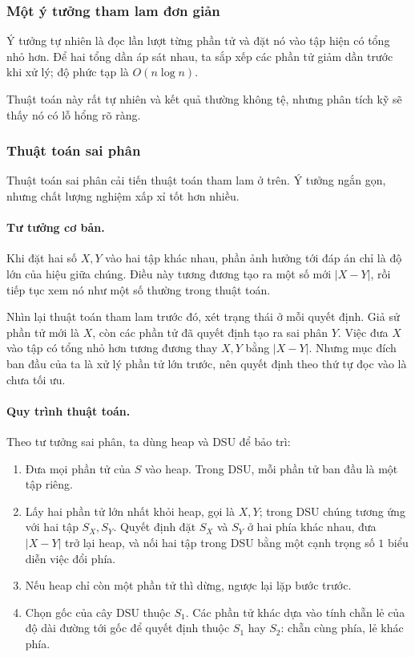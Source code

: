 \documentclass[11pt]{article}
\begin{document}
\subsubsection{Một ý tưởng tham lam đơn giản}

Ý tưởng tự nhiên là đọc lần lượt từng phần tử và đặt nó vào tập hiện có tổng nhỏ
hơn. Để hai tổng dần áp sát nhau, ta sắp xếp các phần tử giảm dần trước khi xử
lý; độ phức tạp là \(O(n\log n)\).

Thuật toán này rất tự nhiên và kết quả thường không tệ, nhưng phân tích kỹ sẽ
thấy nó có lỗ hổng rõ ràng.

\subsubsection{Thuật toán sai phân}

Thuật toán sai phân cải tiến thuật toán tham lam ở trên. Ý tưởng ngắn gọn,
nhưng chất lượng nghiệm xấp xỉ tốt hơn nhiều.

\paragraph{Tư tưởng cơ bản.}
Khi đặt hai số \(X,Y\) vào hai tập khác nhau, phần ảnh hưởng tới đáp án chỉ là
độ lớn của hiệu giữa chúng. Điều này tương đương tạo ra một số mới
\(|X-Y|\), rồi tiếp tục xem nó như một số thường trong thuật toán.

Nhìn lại thuật toán tham lam trước đó, xét trạng thái ở mỗi quyết định. Giả sử
phần tử mới là \(X\), còn các phần tử đã quyết định tạo ra sai phân \(Y\). Việc
đưa \(X\) vào tập có tổng nhỏ hơn tương đương thay \(X,Y\) bằng
\(|X-Y|\). Nhưng mục đích ban đầu của ta là xử lý phần tử lớn trước, nên quyết
định theo thứ tự đọc vào là chưa tối ưu.

\paragraph{Quy trình thuật toán.}
Theo tư tưởng sai phân, ta dùng heap và DSU để bảo trì:
\begin{enumerate}
  \item Đưa mọi phần tử của \(S\) vào heap. Trong DSU, mỗi phần tử ban đầu là một
  tập riêng.
  \item Lấy hai phần tử lớn nhất khỏi heap, gọi là \(X,Y\); trong DSU chúng tương
  ứng với hai tập \(S_X,S_Y\). Quyết định đặt \(S_X\) và \(S_Y\) ở hai phía khác
  nhau, đưa \(|X-Y|\) trở lại heap, và nối hai tập trong DSU bằng một cạnh trọng
  số \(1\) biểu diễn việc đổi phía.
  \item Nếu heap chỉ còn một phần tử thì dừng, ngược lại lặp bước trước.
  \item Chọn gốc của cây DSU thuộc \(S_1\). Các phần tử khác dựa vào tính chẵn lẻ
  của độ dài đường tới gốc để quyết định thuộc \(S_1\) hay \(S_2\): chẵn cùng
  phía, lẻ khác phía.
\end{enumerate}
\end{document}

